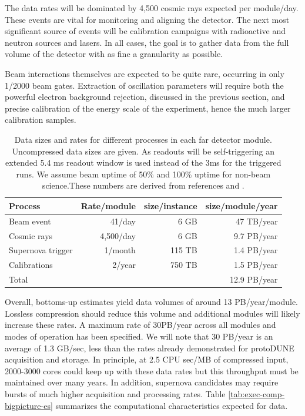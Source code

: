 The data rates will be dominated by 4,500 cosmic rays expected per module/day.  These events are vital for monitoring and aligning the detector.  The next most significant source of events will be calibration campaigns with radioactive and neutron sources and lasers.  In all cases, the goal is to gather data from the full volume of the detector with as fine a granularity as possible. 

Beam interactions themselves are expected to be quite rare, occurring in only 1/2000 beam gates.  Extraction of oscillation parameters will require both the powerful electron background rejection, discussed in the previous section,  and precise calibration of the energy scale of the experiment, hence the much larger calibration samples. 


 \begin{table}[htp]

\begin{center}
\begin{tabular}{|l |r r r |}
\hline
Process & Rate/module & \qquad size/instance &\qquad  size/module/year\\
\hline
Beam event & 41/day & 6 GB&47 TB/year\\
Cosmic rays &4,500/day&  6 GB& 9.7 PB/year\\
Supernova trigger& 1/month& 115 TB& 1.4 PB/year\\
Calibrations&2/year&750 TB& 1.5 PB/year\\
\hline 
Total& & &12.9 PB/year\\
\hline
\end{tabular}
\end{center}
\caption{Data sizes and rates for different processes in each far detector module.  Uncompressed data sizes are given. As readouts will be self-triggering an extended 5.4 ms readout window is used instead of the 3ms for the triggered  runs.  We assume beam uptime of 50\% and 100\% uptime for non-beam science.These numbers are derived from references and .}
\label{volumes}
\end{table}%

Overall, bottoms-up estimates yield data volumes of around 13 PB/year/module.  Lossless compression should reduce this volume and additional modules will likely increase these rates.  A maximum rate of 30PB/year across all modules and modes of operation has been specified.  We will note that 30 PB/year is  an average of 1.3 GB/sec, less than the rates already demonstrated for protoDUNE acquisition and storage.  In principle, at 2.5 CPU sec/MB of compressed input, 2000-3000 cores could keep up with these data rates  but this throughput must be maintained over many years.   In addition, supernova candidates may require bursts of  much higher acquisition and processing rates. Table \ref{tab:exec-comp-bigpicture-es} summarizes the computational characteristics expected for  data. 


